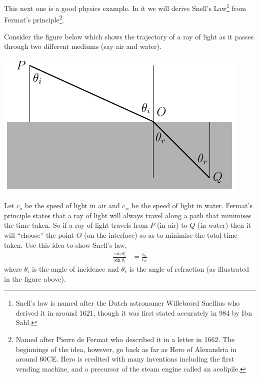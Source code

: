 \begin{eg}
\begin{itemize}
\end{itemize}

\end{eg}


This next one is a good physics example. In it we will derive Snell's
Law\footnote{Snell's law is named after the Dutch astronomer Willebrord Snellius
who derived it in around 1621, though it was first stated accurately in 984 by
Ibn Sahl.} from Fermat's principle\footnote{Named after Pierre de Fermat who
described it in a letter in 1662. The beginnings of the idea, however, go back
as far as Hero of Alexandria in around 60CE. Hero is credited with many
inventions including the first vending machine, and a precursor of the steam
engine called an aeolipile.}.
\begin{eg}\label{APPglobalMaxMinF}
Consider the figure below which shows the trajectory of a ray of light as it
passes through two different mediums (say air and water).
\begin{efig}
\begin{center}
   \includegraphics{snell}
\end{center}
\end{efig}
Let $c_a$ be the speed of light in air and $c_w$ be the speed of
light in water. Fermat's principle states that a ray of light will always
travel along a path that minimises the time taken. So if a ray of light travels
from $P$ (in air) to $Q$ (in water) then it will ``choose'' the point $O$ (on
the interface) so as to minimise the total time taken. Use this idea to show
Snell's law,
\begin{align*}
  \frac{\sin\theta_i}{\sin\theta_r}&=\frac{c_a}{c_w}
\end{align*}
where $\theta_i$ is the angle of incidence and $\theta_r$ is the angle
of refraction (as illustrated in the figure above).



\end{eg}

